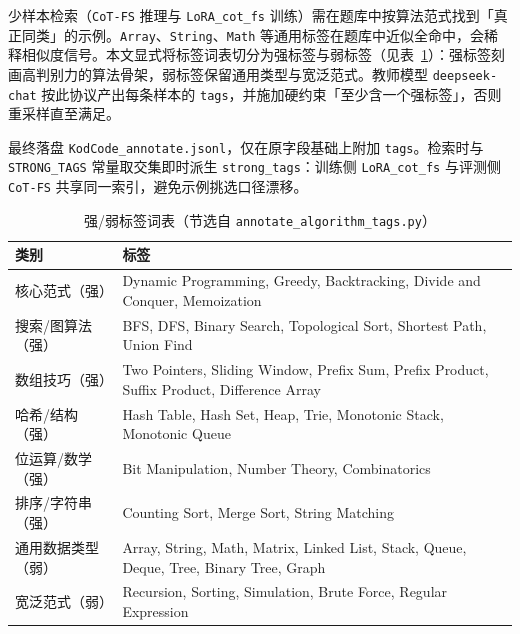
少样本检索（\texttt{CoT-FS} 推理与 \texttt{LoRA\_cot\_fs} 训练）需在题库中按算法范式找到「真正同类」的示例。\texttt{Array}、\texttt{String}、\texttt{Math} 等通用标签在题库中近似全命中，会稀释相似度信号。本文显式将标签词表切分为强标签与弱标签（见表~\ref{tab:ch3-tags}）：强标签刻画高判别力的算法骨架，弱标签保留通用类型与宽泛范式。教师模型 \texttt{deepseek-chat} 按此协议产出每条样本的 \texttt{tags}，并施加硬约束「至少含一个强标签」，否则重采样直至满足。

最终落盘 \texttt{KodCode\_annotate.jsonl}，仅在原字段基础上附加 \texttt{tags}。检索时与 \texttt{STRONG\_TAGS} 常量取交集即时派生 \texttt{strong\_tags}：训练侧 \texttt{LoRA\_cot\_fs} 与评测侧 \texttt{CoT-FS} 共享同一索引，避免示例挑选口径漂移。

\begin{table}[!htb]
  \centering
  \caption{强/弱标签词表（节选自 \texttt{annotate\_algorithm\_tags.py}）}
  \label{tab:ch3-tags}
  \footnotesize
  \hspace{-2cm}
  \begin{tabular}{p{3cm} p{13cm}}
    \toprule
    \textbf{类别} & \textbf{标签}\\
    \midrule
    核心范式（强）    & Dynamic Programming, Greedy, Backtracking, Divide and Conquer, Memoization\\
    搜索/图算法（强） & BFS, DFS, Binary Search, Topological Sort, Shortest Path, Union Find\\
    数组技巧（强）    & Two Pointers, Sliding Window, Prefix Sum, Prefix Product, Suffix Product, Difference Array\\
    哈希/结构（强）   & Hash Table, Hash Set, Heap, Trie, Monotonic Stack, Monotonic Queue\\
    位运算/数学（强） & Bit Manipulation, Number Theory, Combinatorics\\
    排序/字符串（强） & Counting Sort, Merge Sort, String Matching\\
    \midrule
    通用数据类型（弱） & Array, String, Math, Matrix, Linked List, Stack, Queue, Deque, Tree, Binary Tree, Graph\\
    宽泛范式（弱）     & Recursion, Sorting, Simulation, Brute Force, Regular Expression\\
    \bottomrule
  \end{tabular}
\end{table}

